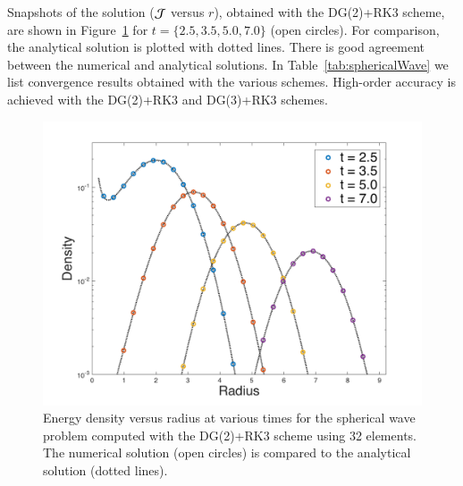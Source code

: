 \documentclass[11pt,letterpaper,twoside,english,final]{article}
\begin{document}
Snapshots of the solution ($\mathcal{J}$ versus $r$), obtained with the DG(2)+RK3 scheme, are shown in Figure~\ref{fig:sphericalWave} for $t=\{2.5,3.5,5.0,7.0\}$ (open circles).  
For comparison, the analytical solution is plotted with dotted lines.  
There is good agreement between the numerical and analytical solutions.  
In Table~\ref{tab:sphericalWave} we list convergence results obtained with the various schemes.  
High-order accuracy is achieved with the DG(2)+RK3 and DG(3)+RK3 schemes.  

\begin{figure}[h]
  \centering
  \includegraphics[scale=0.78]{./Figures/GaussianSphericalWave1D}
  \vspace{-0.1in}
  \flushleft\caption[Energy density versus radius at various times for the spherical wave problem computed with the DG(2)+RK3 scheme using 32 elements.]{Energy density versus radius at various times for the spherical wave problem computed with the DG(2)+RK3 scheme using 32 elements.  \textmd{The numerical solution (open circles) is compared to the analytical solution (dotted lines).}}
  \label{fig:sphericalWave}
\end{figure}
\end{document}
